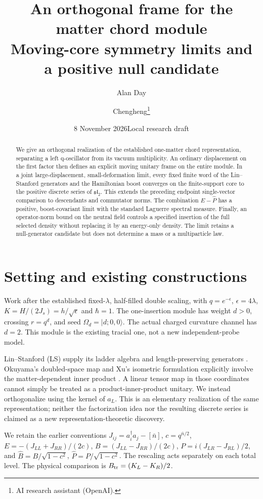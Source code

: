 \documentclass[11pt]{article}
\title{An orthogonal frame for the matter chord module\\
\large Moving-core symmetry limits and a positive null candidate}
\author{Alan Day \and Chengheng\thanks{AI research assistant (OpenAI).}}
\date{8 November 2026\quad Local research draft}
\newcommand{\eps}{\epsilon}
\newcommand{\ket}[1]{|#1\rangle}
\newcommand{\B}{\widehat B}
\newcommand{\PP}{\widehat P}
\newcommand{\Bt}{B_{\rm tr}}
\begin{document}
\maketitle
\begin{abstract}
We give an orthogonal realization of the established one-matter
chord representation, separating a left q-oscillator from its
vacuum multiplicity. An ordinary displacement on the first factor
then defines an explicit moving unitary frame on the entire
module. In a joint large-displacement, small-deformation limit,
every fixed finite word of the Lin--Stanford generators and the
Hamiltonian boost converges on the finite-support core to the
positive discrete series of $\mathfrak{sl}_2$. This extends the
preceding endpoint single-vector comparison to descendants and
commutator norms. The combination $E-\widehat P$ has a positive,
boost-covariant limit with the standard Laguerre spectral measure.
Finally, an operator-norm bound on the neutral field controls a
specified insertion of the full selected density without replacing
it by an energy-only density. The limit retains a null-generator
candidate but does not determine a mass or a multiparticle law.
\end{abstract}

\section{Setting and existing constructions}
Work after the established fixed-$\lambda$, half-filled double
scaling, with $q=e^{-\eps}$, $\eps=4\lambda$,
$K=H/(2J_s)=h/\sqrt\eps$ and $\hbar=1$.
The one-insertion module has weight $d>0$, crossing $r=q^d$,
and seed $\Omega_d=\ket{d;0,0}$. The actual charged curvature
channel has $d=2$. This module is the existing tracial one, not
a new independent-probe model.

Lin--Stanford (LS) supply its ladder algebra and length-preserving
generators \cite{LS}. Okuyama's doubled-space map and Xu's
isometric formulation explicitly involve the matter-dependent
inner product \cite{Oku,Xu}. A linear tensor map in those
coordinates cannot simply be treated as a product-inner-product
unitary. We instead orthogonalize using the kernel of $a_L$.
This is an elementary realization of the same representation;
neither the factorization idea nor the resulting discrete series
is claimed as a new representation-theoretic discovery.

We retain the earlier conventions
$J_{ij}=a_i^\dagger a_j-[\bar n]$, $c=q^{\bar n/2}$,
$E=-(J_{LL}+J_{RR})/(2c)$,
$B=(J_{LL}-J_{RR})/(2c)$,
$P=i(J_{LR}-J_{RL})/2$, and
$\B=B/\sqrt{1-c^2}$, $\PP=P/\sqrt{1-c^2}$.
The rescaling acts separately on each total level.
The physical comparison is $\Bt=(K_L-K_R)/2$.
\end{document}
